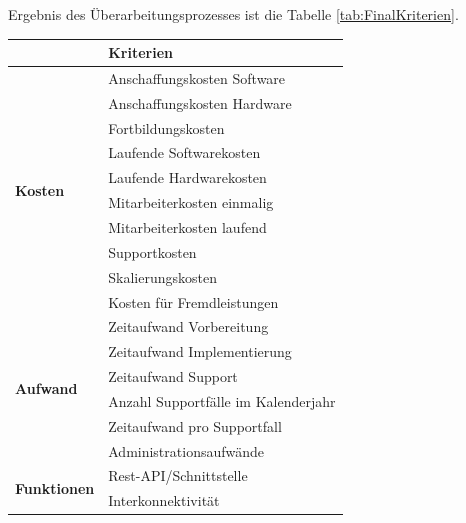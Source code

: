 Ergebnis des Überarbeitungsprozesses ist die Tabelle \ref{tab:FinalKriterien}.

\begin{table}
	\centering
	\begin{tabular}{l|l|}
		                                       & \textbf{Kriterien}                  \\
		\hline \hline
		\multirow{10}{6em}{\textbf{Kosten}}    & Anschaffungskosten Software         \\
		~                                      & Anschaffungskosten Hardware         \\
		~                                      & Fortbildungskosten                  \\
		~                                      & Laufende Softwarekosten             \\
		~                                      & Laufende Hardwarekosten             \\
		~                                      & Mitarbeiterkosten einmalig          \\
		~                                      & Mitarbeiterkosten laufend           \\
		~                                      & Supportkosten                       \\
		~                                      & Skalierungskosten                   \\
		~                                      & Kosten für Fremdleistungen          \\
		\cline{2-2}
		\multirow{6}{6em}{\textbf{Aufwand}}    & Zeitaufwand Vorbereitung            \\
		~                                      & Zeitaufwand Implementierung         \\
		~                                      & Zeitaufwand Support                 \\
		~                                      & Anzahl Supportfälle im Kalenderjahr \\
		~                                      & Zeitaufwand pro Supportfall         \\
		~                                      & Administrationsaufwände             \\
		\cline{2-2}
		\multirow{2}{6em}{\textbf{Funktionen}} & Rest-API/Schnittstelle              \\
		~                                      & Interkonnektivität                  \\

\end{tabular}
\end{table}

